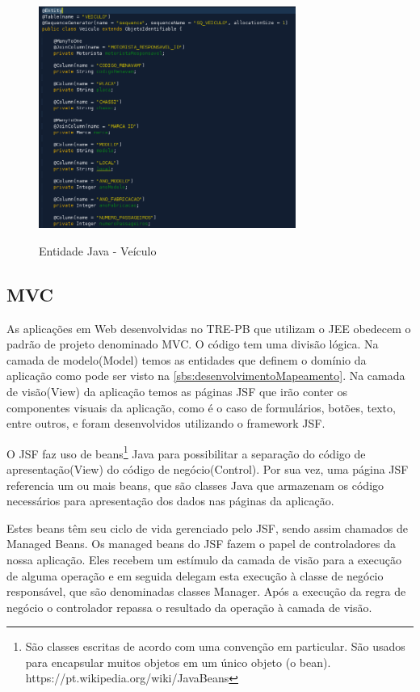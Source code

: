 \begin{figure}[!htb]
    \centering
    \caption{Entidade Java - Veículo}
    \includegraphics[width=0.75\textwidth]{dados/figuras/entidade.png}
    \label{fig:figura-entidade}
\end{figure}

\subsection{MVC}

As aplicações em Web desenvolvidas no TRE-PB que utilizam o JEE obedecem o padrão de projeto denominado MVC. O código tem uma divisão lógica. 
Na camada de modelo(Model) temos as entidades que definem o domínio da aplicação como pode ser visto na \autoref{sbs:desenvolvimentoMapeamento}. 
Na camada de visão(View) da aplicação temos as páginas JSF que irão conter os componentes visuais da aplicação, como é o caso de formulários, botões, texto, entre outros, e foram desenvolvidos utilizando o framework JSF. 

O JSF faz uso de beans\footnote{São classes escritas de acordo com uma convenção em particular. São usados para encapsular muitos objetos em um único objeto (o bean). https://pt.wikipedia.org/wiki/JavaBeans} Java para possibilitar a separação do código de apresentação(View) do código de negócio(Control). Por sua vez, uma página JSF referencia um ou mais beans, que são classes Java que armazenam os código necessários para apresentação dos dados nas páginas da aplicação. 

Estes beans têm seu ciclo de vida gerenciado pelo JSF, sendo assim chamados de Managed Beans.
Os managed beans do JSF fazem o papel de controladores da nossa aplicação. Eles recebem um estímulo da camada de visão para a execução de alguma operação e em seguida delegam esta execução à classe de negócio responsável, que são denominadas classes Manager. Após a execução da regra de negócio o controlador repassa o resultado da operação à camada de visão.

